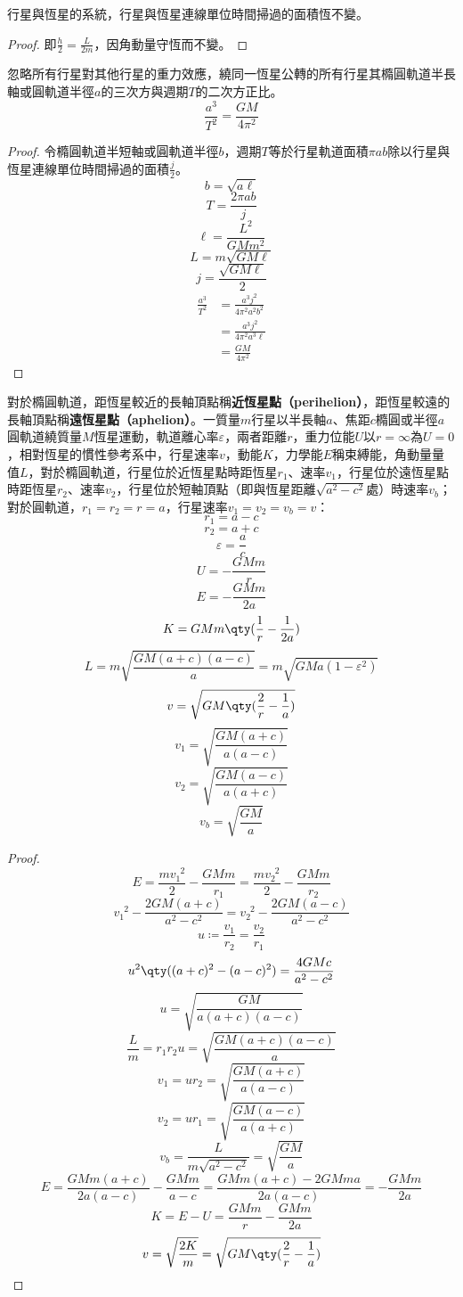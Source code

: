 \documentclass[a4paper,12pt]{article}
\begin{document}
行星與恆星的系統，行星與恆星連線單位時間掃過的面積恆不變。
\begin{proof}
即$\frac{h}{2}=\frac{L}{2m}$，因角動量守恆而不變。
\end{proof}
忽略所有行星對其他行星的重力效應，繞同一恆星公轉的所有行星其橢圓軌道半長軸或圓軌道半徑$a$的三次方與週期$T$的二次方正比。
\[\frac{a^3}{T^2}=\frac{GM}{4\pi^2}\]
\begin{proof}
令橢圓軌道半短軸或圓軌道半徑$b$，週期$T$等於行星軌道面積$\pi ab$除以行星與恆星連線單位時間掃過的面積$\frac{j}{2}$。
\[b=\sqrt{a\ell}\]
\[T=\frac{2\pi ab}{j}\]
\[\ell=\frac{L^2}{GMm^2}\]
\[L=m\sqrt{GM\ell}\]
\[j=\frac{\sqrt{GM\ell}}{2}\]
\[\begin{aligned}
\frac{a^3}{T^2}&=\frac{a^3j^2}{4\pi^2 a^2b^2}\\
&=\frac{a^3j^2}{4\pi^2a^3\ell}\\
&=\frac{GM}{4\pi^2}
\end{aligned}\]
\end{proof}
對於橢圓軌道，距恆星較近的長軸頂點稱\textbf{近恆星點（perihelion）}，距恆星較遠的長軸頂點稱\textbf{遠恆星點（aphelion）}。一質量$m$行星以半長軸$a$、焦距$c$橢圓或半徑$a$圓軌道繞質量$M$恆星運動，軌道離心率$\varepsilon$，兩者距離$r$，重力位能$U$以$r=\infty$為$U=0$，相對恆星的慣性參考系中，行星速率$v$，動能$K$，力學能$E$稱束縛能，角動量量值$L$，對於橢圓軌道，行星位於近恆星點時距恆星$r_1$、速率$v_1$，行星位於遠恆星點時距恆星$r_2$、速率$v_2$，行星位於短軸頂點（即與恆星距離$\sqrt{a^2-c^2}$處）時速率$v_b$；對於圓軌道，$r_1=r_2=r=a$，行星速率$v_1=v_2=v_b=v$：
\[r_1=a-c\]
\[r_2=a+c\]
\[\varepsilon=\frac{a}{c}\]
\[U=-\frac{GMm}{r}\]
\[E=-\frac{GMm}{2a}\]
\[K=GMm\qty(\frac{1}{r}-\frac{1}{2a})\]
\[L=m\sqrt{\frac{GM(a+c)(a-c)}{a}}=m\sqrt{GMa(1-\varepsilon^2)}\]
\[v=\sqrt{GM\qty(\frac{2}{r}-\frac{1}{a})}\]
\[v_1=\sqrt{\frac{GM(a+c)}{a(a-c)}}\]
\[v_2=\sqrt{\frac{GM(a-c)}{a(a+c)}}\]
\[v_b=\sqrt{\frac{GM}{a}}\]
\begin{proof}
\[E=\frac{mv_1^{\phantom{1}2}}{2}-\frac{GMm}{r_1}=\frac{mv_2^{\phantom{2}2}}{2}-\frac{GMm}{r_2}\]
\[v_1^{\phantom{1}2}-\frac{2GM(a+c)}{a^2-c^2}=v_2^{\phantom{2}2}-\frac{2GM(a-c)}{a^2-c^2}\]
\[u\coloneq\frac{v_1}{r_2}=\frac{v_2}{r_1}\]
\[u^2\qty((a+c)^2-(a-c)^2)=\frac{4GMc}{a^2-c^2}\]
\[u=\sqrt{\frac{GM}{a(a+c)(a-c)}}\]
\[\frac{L}{m}=r_1r_2u=\sqrt{\frac{GM(a+c)(a-c)}{a}}\]
\[v_1=ur_2=\sqrt{\frac{GM(a+c)}{a(a-c)}}\]
\[v_2=ur_1=\sqrt{\frac{GM(a-c)}{a(a+c)}}\]
\[v_b=\frac{L}{m\sqrt{a^2-c^2}}=\sqrt{\frac{GM}{a}}\]
\[E=\frac{GMm(a+c)}{2a(a-c)}-\frac{GMm}{a-c}=\frac{GMm(a+c)-2GMma}{2a(a-c)}=-\frac{GMm}{2a}\]
\[K=E-U=\frac{GMm}{r}-\frac{GMm}{2a}\]
\[v=\sqrt{\frac{2K}{m}}=\sqrt{GM\qty(\frac{2}{r}-\frac{1}{a})}\]
\end{proof}
\end{document}
